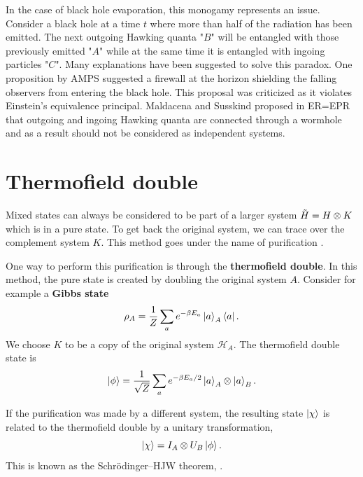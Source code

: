 In the case of black hole evaporation, this monogamy represents an issue. Consider a black hole at a time $t$ where more than half of the radiation has been emitted. The next outgoing Hawking quanta "$B$" will be entangled with those previously emitted "$A$" while at the same time it is entangled with ingoing particles "$C$". Many explanations have been suggested to solve this paradox. One proposition by AMPS\cite{Almheiri_2013} suggested a firewall at the horizon shielding the falling observers from entering the black hole. This proposal was criticized as it violates Einstein's equivalence principal. Maldacena and Susskind \cite{Maldacena_2013} proposed in ER=EPR that outgoing and ingoing Hawking quanta are connected through a wormhole and as a result should not be considered as independent systems.

\section{Thermofield double}

Mixed states can always be considered to be part of a larger system $\Tilde{H} = H\otimes K$ which is in a pure state. To get back the original system, we can trace over the complement system $K$. This method goes under the name of purification \cite{Kleinmann_2006}.

One way to perform this purification is through the \textbf{thermofield double}.  In this method, the pure state is created by doubling the original system $A$. Consider for example a \textbf{Gibbs state}
\begin{equation}\label{Gibbs state}
    \rho_A = \frac{1}{Z}\sum_a e^{-\beta E_a}\ket{a}_A\bra{a}.
\end{equation}
We choose $K$ to be a copy of the original system $\mathcal{H}_A$. The thermofield double state is
\begin{equation}\label{thermofield double}
    \ket{\phi} = \frac{1}{\sqrt{Z}}\sum_a e^{-\beta E_a/2}\ket{a}_A\otimes\ket{a}_B.
\end{equation}

If the purification was made by a different system, the resulting state $\ket{\chi}$ is related to the thermofield double by a unitary transformation,
\begin{equation}
    \ket{\chi} = I_A\otimes U_B \ket{\phi}.    
\end{equation}
This is known as the Schrödinger–HJW theorem, \cite{schrodinger_1936}.

